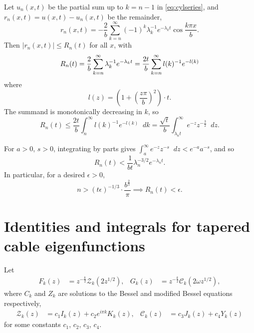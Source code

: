 \documentclass[parskip=half]{scrartcl}
\newcommand{\Int}[2]{\int_{#1}^{#2}\!}
\newcommand{\D}{\mathop{}\!d}
\theoremstyle{nonumberplain}
\begin{document}
Let $u_n(x,t)$ be the partial sum up to $k=n-1$ in \eqref{eq:cylseries}, and $r_n(x,t) = u(x,t) - u_n(x,t)$
be the remainder,
\begin{equation}
    r_n(x,t) = -\frac{2}{b}\sum_{k=n}^{\infty} (-1)^k\lambda_k^{-1}e^{-\lambda_k t}\cos\frac{k\pi x}{b}.
\end{equation}
Then $|r_n(x,t)|\leq R_n(t)$ for all $x$, with
\begin{equation}
    R_n(t) = \frac{2}{b}\sum_{k=n}^{\infty} \lambda_k^{-1}e^{-\lambda_k t}\\
    = \frac{2t}{b}\sum_{k=n}^{\infty} l(k)^{-1}e^{-l(k)}\\
\end{equation}
where
\[
    l(z) = \left(1+\left(\frac{z\pi}{b}\right)^2\right)\cdot t.
\]
The summand is monotonically decreasing in $k$, so
\begin{equation}
    \label{eq:rnigamma}
    R_n(t)
    \leq \frac{2t}{b}\Int{n}{\infty} l(k)^{-1}e^{-l(k)}\D k
    = \frac{\sqrt{t}}{b} \Int{\lambda_n t}{\infty} e^{-z}z^{-\frac{3}{2}} \D z.
\end{equation}

For $a>0$, $s>0$, integrating by parts gives
$\displaystyle \Int{a}{\infty} e^{-z}z^{-s}\D z < e^{-a}a^{-s}$,
and so
\begin{equation}
    R_n(t) < \frac{1}{b t}\lambda_n^{-3/2}e^{-\lambda_n t}.
\end{equation}
In particular, for a desired $\epsilon>0$,
\begin{equation}
    n > (t \epsilon)^{-1/3}\cdot\frac{b^\frac{2}{3}}{\pi}
    \implies
    R_n(t) < \epsilon.
\end{equation}

\section{Identities and integrals for tapered cable eigenfunctions}
\label{ap:conid}

\newcommand{\cZ}{\mathcal{Z}}
\newcommand{\cC}{\mathcal{C}}

\newcommand{\Fp}{\smash{F^{\mathrlap{\prime}}}\mkern-2.0mu}
\newcommand{\Gp}{\smash{G^{\mathrlap{\prime}}}\mkern-2.0mu}

Let
\begin{equation}
    \begin{aligned}
        F_k(z) &= z^{-\frac{k}{2}}\cZ_k(2z^{1/2}),&
        G_k(z) &= z^{-\frac{k}{2}}\cC_k(2\omega z^{1/2}),
    \end{aligned}
\end{equation}
where $C_k$ and $Z_k$ are solutions to the Bessel and modified Bessel equations
respectively,
\begin{equation}
    \begin{aligned}
        \cZ_k(z) &= c_1 I_k(z) + c_2 e^{i\pi k} K_k(z),&
        \cC_k(z) &= c_3 J_k(z) + c_4 Y_k(z)
    \end{aligned}
\end{equation}
for some constants $c_1$, $c_2$, $c_3$, $c_4$.
\end{document}
